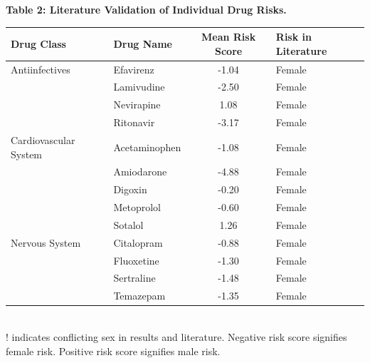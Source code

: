 \documentclass[11pt, oneside]{article}
\begin{document}
\textbf{Table 2: Literature Validation of Individual Drug Risks.}
\medskip\\
\begin{tabular}{llcl}
\toprule
Drug Class & Drug Name &  Mean Risk Score & Risk in Literature \\
\midrule
Antiinfectives & Efavirenz & -1.04 &  Female \cite{whitley_sex-based_2009} \\
               & Lamivudine & -2.50 &  Female \cite{ofotokun_sex_2003} \\
               & Nevirapine &  1.08 &  Female \cite{ofotokun_sex_2003, whitley_sex-based_2009} \\
               & Ritonavir & -3.17 &  Female \cite{ofotokun_sex_2003} \\
\midrule
Cardiovascular System & Acetaminophen & -1.08 &  Female \cite{rademaker_women_2001, tharpe_adverse_2011} \\
               & Amiodarone & -4.88 &  Female \cite{drici_is_2001} \\
               & Digoxin & -0.20 &  Female \cite{whitley_sex-based_2009, rademaker_women_2001, tharpe_adverse_2011} \\
               & Metoprolol & -0.60 &  Female \cite{whitley_sex-based_2009} \\
               & Sotalol &  1.26 &  Female \cite{drici_is_2001} \\
\midrule
Nervous System & Citalopram & -0.88 &  Female \cite{tharpe_adverse_2011} \\
               & Fluoxetine & -1.30 &  Female \cite{bigos_sex_2009} \\
               & Sertraline & -1.48 &  Female \cite{bigos_sex_2009} \\
               & Temazepam & -1.35 &  Female \cite{rademaker_women_2001} \\
\bottomrule
\end{tabular}
\medskip\\
! indicates conflicting sex in results and literature. Negative risk score signifies female risk. Positive risk score signifies male risk.
\end{document}
